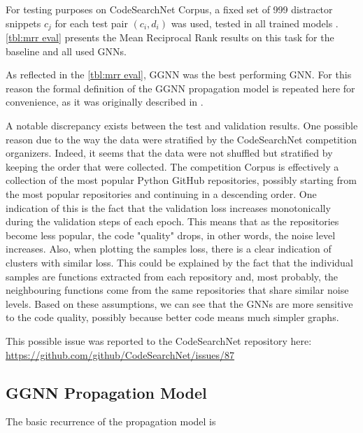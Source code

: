 \documentclass{article}
\begin{document}
For testing purposes on CodeSearchNet Corpus, a fixed set
of 999 distractor snippets $c_j$ for each test pair $(c_i
, d_i)$ was used, tested in all trained models . \autoref{tbl:mrr eval} presents the Mean Reciprocal Rank results on this task for the baseline and all used GNNs.

As reflected in the \autoref{tbl:mrr eval}, GGNN was the best performing GNN. For this reason the formal definition of the GGNN propagation model is repeated here for convenience, as it was originally described in \cite{1511.05493}. 

A notable discrepancy exists between the test and validation results. One possible reason due to the way the data were stratified by the CodeSearchNet competition organizers. Indeed, it seems that the data were not shuffled but stratified by keeping the order that were collected. The competition Corpus is effectively a collection of the most popular Python GitHub repositories, possibly starting from the most popular repositories and continuing in a descending order. One indication of this is the fact that the validation loss increases monotonically during the validation steps of each epoch. This means that as the repositories become less popular, the code "quality" drops, in other words, the noise level increases.
Also, when plotting the samples loss, there is a clear indication of clusters with similar loss. This could be explained by the fact that the individual samples are functions extracted from each repository and, most probably, the neighbouring functions come from the same repositories that share similar noise levels.
Based on these assumptions, we can see that the GNNs are more sensitive to the code quality, possibly because better code means much simpler graphs.

This possible issue was reported to the CodeSearchNet repository here:  \url{https://github.com/github/CodeSearchNet/issues/87}

\subsection{GGNN Propagation Model}

The basic recurrence of the propagation model is
\end{document}
